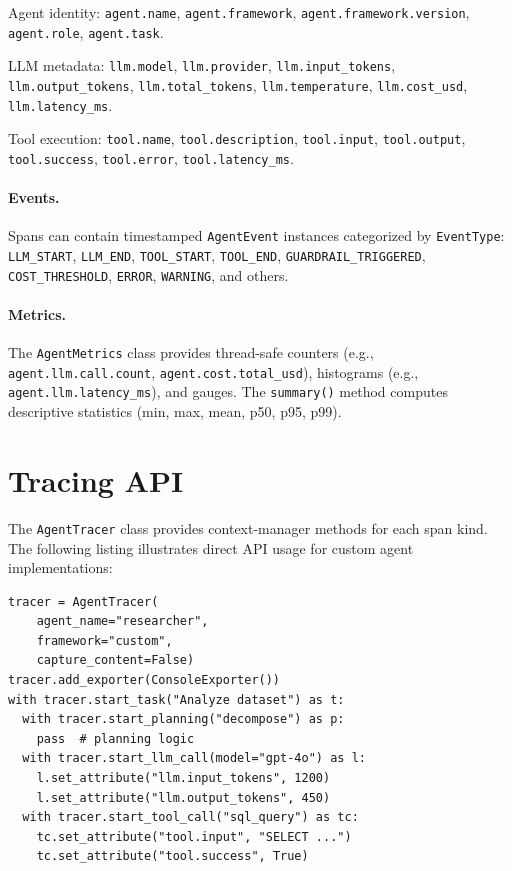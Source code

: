 \documentclass[sigplan,10pt,screen]{acmart}
\begin{document}
\begin{description}[leftmargin=*,nosep,style=unboxed]
    \item[\texttt{agent.*}] Agent identity: \texttt{agent.name}, \texttt{agent.framework}, \texttt{agent.framework.version}, \texttt{agent.role}, \texttt{agent.task}.
    \item[\texttt{llm.*}] LLM metadata: \texttt{llm.model}, \texttt{llm.provider}, \texttt{llm.input\_tokens}, \texttt{llm.output\_tokens}, \texttt{llm.total\_tokens}, \texttt{llm.temperature}, \texttt{llm.cost\_usd}, \texttt{llm.latency\_ms}.
    \item[\texttt{tool.*}] Tool execution: \texttt{tool.name}, \texttt{tool.description}, \texttt{tool.input}, \texttt{tool.output}, \texttt{tool.success}, \texttt{tool.error}, \texttt{tool.latency\_ms}.
\end{description}

\paragraph{Events.}
Spans can contain timestamped \texttt{AgentEvent} instances categorized by \texttt{EventType}: \texttt{LLM\_START}, \texttt{LLM\_END}, \texttt{TOOL\_START}, \texttt{TOOL\_END}, \texttt{GUARDRAIL\_TRIGGERED}, \texttt{COST\_THRESHOLD}, \texttt{ERROR}, \texttt{WARNING}, and others.

\paragraph{Metrics.}
The \texttt{AgentMetrics} class provides thread-safe counters (e.g., \texttt{agent.llm.call.count}, \texttt{agent.cost.total\_usd}), histograms (e.g., \texttt{agent.llm.latency\_ms}), and gauges.  The \texttt{summary()} method computes descriptive statistics (min, max, mean, p50, p95, p99).

\section{Tracing API}
\label{app:tracing_api}

The \texttt{AgentTracer} class provides context-manager methods for each span kind.  The following listing illustrates direct API usage for custom agent implementations:

\begin{lstlisting}[caption={Direct tracing API for custom agents.}]
tracer = AgentTracer(
    agent_name="researcher",
    framework="custom",
    capture_content=False)
tracer.add_exporter(ConsoleExporter())
with tracer.start_task("Analyze dataset") as t:
  with tracer.start_planning("decompose") as p:
    pass  # planning logic
  with tracer.start_llm_call(model="gpt-4o") as l:
    l.set_attribute("llm.input_tokens", 1200)
    l.set_attribute("llm.output_tokens", 450)
  with tracer.start_tool_call("sql_query") as tc:
    tc.set_attribute("tool.input", "SELECT ...")
    tc.set_attribute("tool.success", True)
\end{lstlisting}
\end{document}
